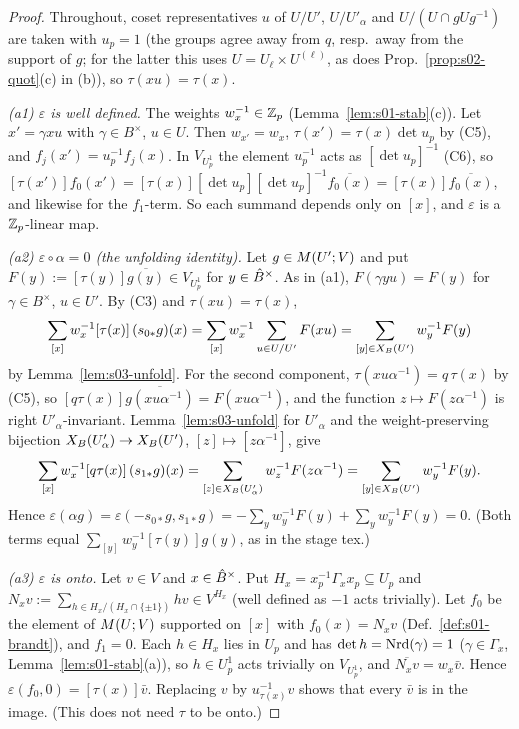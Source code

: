 \begin{proof}
Throughout, coset representatives $u$ of $U/U'$, $U/U'_\alpha$ and $U/(U\cap gUg^{-1})$ are taken with $u_p=1$ (the groups agree away from $q$, resp.\
away from the support of $g$; for the latter this uses $U=U_\ell\times U^{(\ell)}$, as does Prop.~\ref{prop:s02-quot}(c) in (b)), so $\tau(xu)=\tau(x)$.

\emph{(a1) $\varepsilon$ is well defined.} The weights $w_x^{-1}\in\mathbb{Z}_p$ (Lemma~\ref{lem:s01-stab}(c)). Let $x'=\gamma xu$ with $\gamma\in B^\times$, $u\in U$. Then
$w_{x'}=w_x$, $\tau(x')=\tau(x)\det u_p$ by (C5), and $f_j(x')=u_p^{-1}f_j(x)$. In $V_{U^1_p}$ the element $u_p^{-1}$ acts as $[\det u_p]^{-1}$ (C6), so
$[\tau(x')]f_0(x')=[\tau(x)][\det u_p][\det u_p]^{-1}\overline{f_0(x)}=[\tau(x)]\overline{f_0(x)}$, and likewise for the $f_1$-term. So each summand depends only on
$[x]$, and $\varepsilon$ is a $\mathbb{Z}_p$-linear map.

\emph{(a2) $\varepsilon\circ\alpha=0$ (the unfolding identity).} Let $g\in M(U';V)$ and put $F(y):=[\tau(y)]\overline{g(y)}\in V_{U^1_p}$ for $y\in\hat{B}^\times$. As in
(a1), $F(\gamma yu)=F(y)$ for $\gamma\in B^\times$, $u\in U'$. By (C3) and $\tau(xu)=\tau(x)$,
\[\sum_{[x]}w_x^{-1}[\tau(x)]\,(s_{0*}g)(x)=\sum_{[x]}w_x^{-1}\sum_{u\in U/U'}F(xu)=\sum_{[y]\in X_B(U')}w_y^{-1}F(y)\]
by Lemma~\ref{lem:s03-unfold}. For the second component, $\tau(xu\alpha^{-1})=q\,\tau(x)$ by (C5), so $[q\tau(x)]\overline{g(xu\alpha^{-1})}=F(xu\alpha^{-1})$, and the
function $z\mapsto F(z\alpha^{-1})$ is right $U'_\alpha$-invariant. Lemma~\ref{lem:s03-unfold} for $U'_\alpha$ and the weight-preserving bijection
$X_B(U'_\alpha)\to X_B(U')$, $[z]\mapsto[z\alpha^{-1}]$, give
\[\sum_{[x]}w_x^{-1}[q\tau(x)]\,(s_{1*}g)(x)=\sum_{[z]\in X_B(U'_\alpha)}w_z^{-1}F(z\alpha^{-1})=\sum_{[y]\in X_B(U')}w_y^{-1}F(y).\]
Hence $\varepsilon(\alpha g)=\varepsilon(-s_{0*}g,s_{1*}g)=-\sum_yw_y^{-1}F(y)+\sum_yw_y^{-1}F(y)=0$. (Both terms equal $\sum_{[y]}w_y^{-1}[\tau(y)]g(y)$, as in the stage tex.)

\emph{(a3) $\varepsilon$ is onto.} Let $v\in V$ and $x\in\hat{B}^\times$. Put $H_x=x_p^{-1}\Gamma_xx_p\subseteq U_p$ and $N_xv:=\sum_{h\in H_x/(H_x\cap\{\pm1\})}hv\in V^{H_x}$ (well
defined as $-1$ acts trivially). Let $f_0$ be the element of $M(U;V)$ supported on $[x]$ with $f_0(x)=N_xv$ (Def.~\ref{def:s01-brandt}), and $f_1=0$. Each
$h\in H_x$ lies in $U_p$ and has $\det h=\mathrm{Nrd}(\gamma)=1$ ($\gamma\in\Gamma_x$, Lemma~\ref{lem:s01-stab}(a)), so $h\in U^1_p$ acts trivially on $V_{U^1_p}$, and
$\overline{N_xv}=w_x\bar v$. Hence $\varepsilon(f_0,0)=[\tau(x)]\bar v$. Replacing $v$ by $u_{\tau(x)}^{-1}v$ shows that every $\bar v$ is in the image. (This does
not need $\tau$ to be onto.)


\end{proof}
